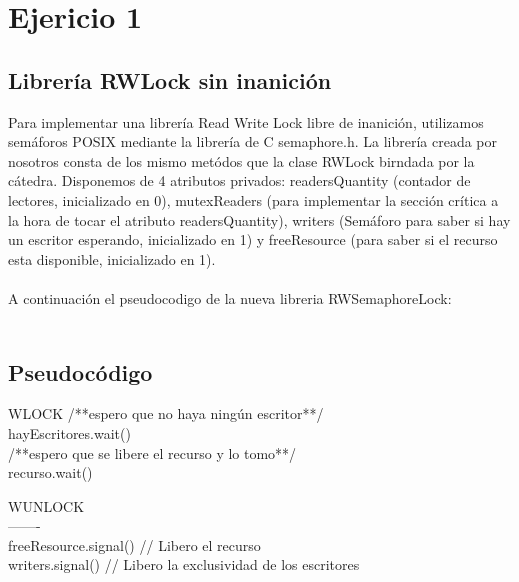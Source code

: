 \section{Ejericio 1}
\subsection{Librería RWLock sin inanición}
Para implementar una librer\'ia Read Write Lock libre de inanici\'on, utilizamos semáforos POSIX mediante la librería de C semaphore.h. La librería creada por nosotros consta de los mismo metódos que la clase RWLock birndada por la cátedra. Disponemos de 4 atributos privados: readersQuantity (contador de lectores, inicializado en 0), mutexReaders (para implementar la sección crítica a la hora de tocar el atributo readersQuantity), writers (Semáforo para saber si hay un escritor esperando, inicializado en 1) y freeResource (para saber si el recurso esta disponible, inicializado en 1).\\
\\
A continuación el pseudocodigo de la nueva libreria RWSemaphoreLock:\\
\\
\subsection{Pseudoc\'odigo}

\begin{codebox}
WLOCK
/**espero que no haya ningún escritor**/ \\
hayEscritores.wait() \\
/**espero que se libere el recurso y lo tomo**/ \\
recurso.wait() \\
\end{codebox}
WUNLOCK\\
-------		\\		
	freeResource.signal()		// Libero el recurso	\\
	writers.signal()		// Libero la exclusividad de los escritores\\

